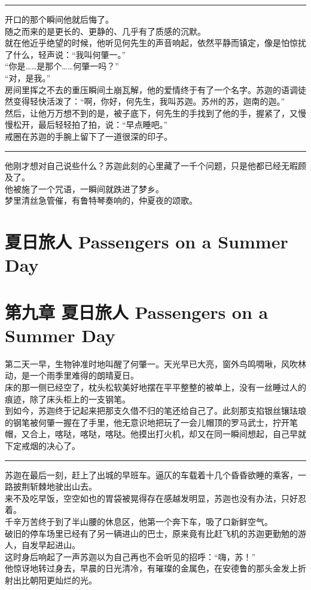 \documentclass[oneside,11pt]{memoir} %
\begin{document}
\begin{CJK}{UTF8}{gbsn}
\rule{-3pt}{30pt}
    开口的那个瞬间他就后悔了。\\\indent
    随之而来的是更长的、更静的、几乎有了质感的沉默。\\\indent
   就在他近乎绝望的时候，他听见何先生的声音响起，依然平静而镇定，像是怕惊扰了什么，轻声说：“我叫何肇一。”\\\indent
    “你是……是那个……何肇一吗？”\\\indent
    “对，是我。”\\\indent
    房间里挥之不去的重压瞬间土崩瓦解，他的爱情终于有了一个名字。苏迦的语调徒然变得轻快活泼了：“啊，你好，何先生，我叫苏迦。苏州的苏，迦南的迦。”\\\indent
   然后，让他万万想不到的是，被子底下，何先生的手找到了他的手，握紧了，又慢慢松开，最后轻轻拍了拍，说：“早点睡吧。”\\\indent
   戒圈在苏迦的手腕上留下了一道很深的印子。\\\indent
\rule{-3pt}{30pt}
    他刚才想对自己说些什么？苏迦此刻的心里藏了一千个问题，只是他都已经无暇顾及了。\\\indent
    他被施了一个咒语，一瞬间就跌进了梦乡。\\\indent
    梦里清丝急管催，有鲁特琴奏响的，仲夏夜的颂歌。\\\indent

\newpage
\chapter{夏日旅人    Passengers on a Summer Day}
\newpage
\chapter*{第九章    夏日旅人    Passengers on a Summer Day}
第二天一早，生物钟准时地叫醒了何肇一。天光早已大亮，窗外鸟鸣啁啾，风吹林动，是一个雨季里难得的朗晴夏日。\\\indent
     床的那一侧已经空了，枕头松软美好地摆在平平整整的被单上，没有一丝睡过人的痕迹，除了床头柜上的一支钢笔。\\\indent
     到如今，苏迦终于记起来把那支久借不归的笔还给自己了。此刻那支掐银丝镶珐琅的钢笔被何肇一握在了手里，他无意识地把玩了一会儿帽顶的罗马武士，拧开笔帽，又合上，喀哒，喀哒，喀哒。他摸出打火机，却又在同一瞬间想起，自己早就下定戒烟的决心了。\\\indent

\rule{-3pt}{30pt}
     苏迦在最后一刻，赶上了出城的早班车。逼仄的车载着十几个昏昏欲睡的乘客，一路披荆斩棘地驶出山去。\\\indent
     来不及吃早饭，空空如也的胃袋被晃得存在感越发明显，苏迦也没有办法，只好忍着。\\\indent
     千辛万苦终于到了半山腰的休息区，他第一个奔下车，吸了口新鲜空气。\\\indent
     破旧的停车场里已经有了另一辆进山的巴士，原来竟有比赶飞机的苏迦更勤勉的游人，自发早起进山。\\\indent
     这时身后响起了一声苏迦以为自己再也不会听见的招呼：“嗨，苏！”\\\indent
     他惊讶地转过身去，早晨的日光清冷，有璀璨的金属色，在安德鲁的那头金发上折射出比朝阳更灿烂的光。\\\indent


\end{CJK}
\end{document}
